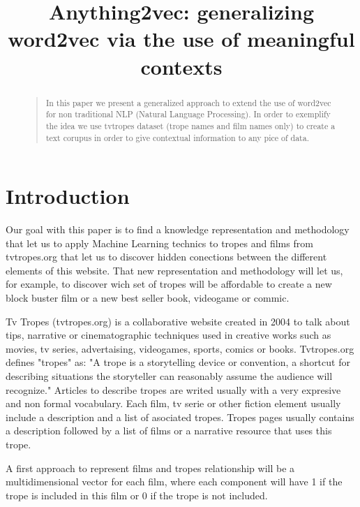 \documentclass[letterpaper]{article}
\title{Anything2vec: generalizing word2vec via the use of meaningful contexts}
\begin{document}
 
\maketitle
\begin{abstract}
\begin{quote}
In this paper we present a generalized approach to extend the use of word2vec for non traditional NLP (Natural Language Processing). In order to exemplify the idea we use tvtropes dataset (trope names and film names only) to create a text corupus in order to give contextual information to any pice of data.
\end{quote}
\end{abstract}

\section{Introduction}


Our goal with this paper is to find a knowledge representation and methodology that let us to apply Machine Learning technics to tropes and films from tvtropes.org that let us to discover hidden conections between the different elements of this website. That new representation and methodology will let us, for example, to discover wich set of tropes will be affordable to create a new block buster film or a new best seller book, videogame or commic.   

Tv Tropes (tvtropes.org) is a collaborative website created in 2004 to talk about tips, narrative or cinematographic techniques used in creative works such as movies, tv series, advertaising, videogames, sports, comics or books. Tvtropes.org defines "tropes" as: "A trope is a storytelling device or convention, a shortcut for describing situations the storyteller can reasonably assume the audience will recognize." Articles to describe tropes are writed usually with a very expresive and non formal vocabulary. Each film, tv serie or other fiction element usually include a description and a list of asociated tropes. Tropes pages usually contains a description followed by a list of films or a narrative resource that uses this trope.   

A first approach to represent films and tropes relationship will be a multidimensional vector for each film, where each component will have 1 if the trope is included in this film or 0 if the trope is not included.  
\end{document}
